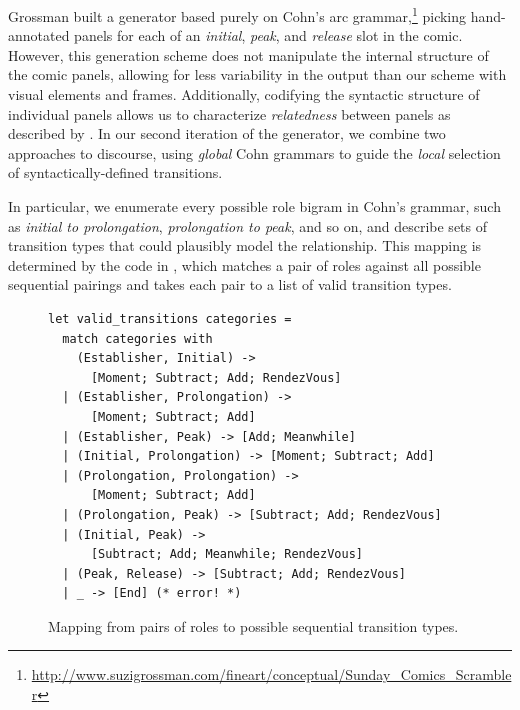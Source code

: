 Grossman built a generator based purely on Cohn's arc grammar,\footnote{
  \url{http://www.suzigrossman.com/fineart/conceptual/Sunday_Comics_Scrambler}
}
picking hand-annotated panels for each of an {\em initial},
{\em peak}, and {\em release} slot in the comic. However, this generation
scheme does not manipulate the internal structure of the comic panels,
allowing for less variability in the output than our scheme with visual
elements and frames. Additionally, codifying the syntactic structure of
individual panels allows us to characterize {\em relatedness} between
panels as described by . In our second
iteration of the generator, we combine two approaches to discourse, using
{\em global} Cohn grammars to guide the {\em local} selection of
syntactically-defined transitions.


In particular, we enumerate every possible role bigram in Cohn's grammar,
such as {\em initial to prolongation}, {\em prolongation to peak}, and so
on, and describe sets of transition types that could plausibly model the
relationship. This mapping is determined by the code in 
, which matches a pair of roles against all 
possible sequential pairings and takes each pair to a list of valid 
transition types.
\begin{figure}
\begin{Verbatim}[fontsize=\scriptsize]
let valid_transitions categories =
  match categories with
    (Establisher, Initial) -> 
      [Moment; Subtract; Add; RendezVous]
  | (Establisher, Prolongation) -> 
      [Moment; Subtract; Add]
  | (Establisher, Peak) -> [Add; Meanwhile]
  | (Initial, Prolongation) -> [Moment; Subtract; Add]
  | (Prolongation, Prolongation) -> 
      [Moment; Subtract; Add]
  | (Prolongation, Peak) -> [Subtract; Add; RendezVous]
  | (Initial, Peak) -> 
      [Subtract; Add; Meanwhile; RendezVous]
  | (Peak, Release) -> [Subtract; Add; RendezVous]
  | _ -> [End] (* error! *)
\end{Verbatim}
\caption{Mapping from pairs of roles to possible sequential transition types.}
\label{figure:transitions}
\end{figure}

